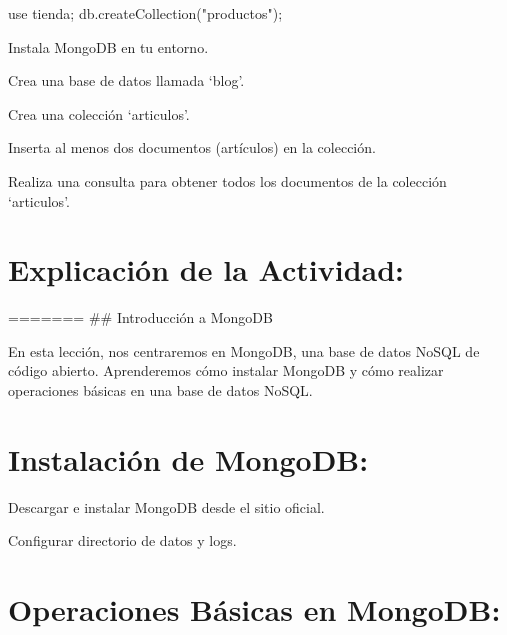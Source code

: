 \documentclass[
  a4paper,
  onepage,
  openany]{scrreprt}
\newenvironment{Shaded}{\begin{snugshade}}{\end{snugshade}}
\newcommand{\NormalTok}[1]{\textcolor[rgb]{0.00,0.23,0.31}{#1}}
\begin{document}
\begin{Shaded}
\begin{Highlighting}[]
\NormalTok{use tienda;}
\NormalTok{db.createCollection("productos");}
\end{Highlighting}
\end{Shaded}

\begin{tcolorbox}[enhanced jigsaw, breakable, opacityback=0, toptitle=1mm, coltitle=black, toprule=.15mm, rightrule=.15mm, colframe=quarto-callout-important-color-frame, opacitybacktitle=0.6, arc=.35mm, title=\textcolor{quarto-callout-important-color}{\faExclamation}\hspace{0.5em}{Actividad Práctica:}, titlerule=0mm, colbacktitle=quarto-callout-important-color!10!white, bottomtitle=1mm, bottomrule=.15mm, colback=white, left=2mm, leftrule=.75mm]

Instala MongoDB en tu entorno.

Crea una base de datos llamada `blog'.

Crea una colección `articulos'.

Inserta al menos dos documentos (artículos) en la colección.

Realiza una consulta para obtener todos los documentos de la colección
`articulos'.

\end{tcolorbox}

\hypertarget{explicaciuxf3n-de-la-actividad-68}{%
\section{Explicación de la
Actividad:}\label{explicaciuxf3n-de-la-actividad-68}}

======= \#\# Introducción a MongoDB

En esta lección, nos centraremos en MongoDB, una base de datos NoSQL de
código abierto. Aprenderemos cómo instalar MongoDB y cómo realizar
operaciones básicas en una base de datos NoSQL.

\hypertarget{instalaciuxf3n-de-mongodb-1}{%
\section{Instalación de MongoDB:}\label{instalaciuxf3n-de-mongodb-1}}

Descargar e instalar MongoDB desde el sitio oficial.

Configurar directorio de datos y logs.

\hypertarget{operaciones-buxe1sicas-en-mongodb-1}{%
\section{Operaciones Básicas en
MongoDB:}\label{operaciones-buxe1sicas-en-mongodb-1}}
\end{document}
